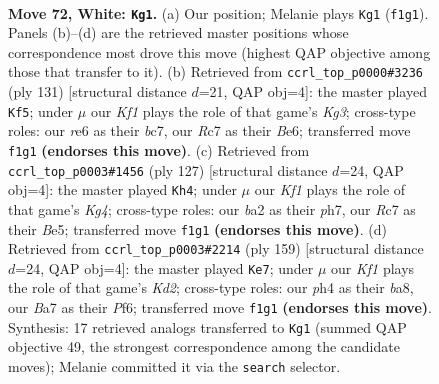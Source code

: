 \documentclass[11pt]{article}
\begin{document}
\clearpage

\begin{figure}[p]\centering
\begin{subfigure}{0.46\textwidth}\centering
\resizebox{\linewidth}{!}{%
\newchessgame
\chessboard[
  setfen={7k/B1R5/4r3/8/B3p2p/5p1P/b4P2/5K2 w - - 54 72},
  showmover=false,
  pgfstyle=straightmove, color=movearrow, markmove={f1-g1}
]}
\caption{}
\end{subfigure}\hfill
\begin{subfigure}{0.46\textwidth}\centering
\resizebox{\linewidth}{!}{%
\newchessgame
\chessboard[
  setfen={8/2B5/2p1b1k1/7p/2pP3P/6P1/3K4/8 b - - 14 66},
  showmover=false,
  pgfstyle=straightmove, color=movearrow, markmove={g6-f5}
]}
\caption{}
\end{subfigure}
\\[4pt]
\begin{subfigure}{0.46\textwidth}\centering
\resizebox{\linewidth}{!}{%
\newchessgame
\chessboard[
  setfen={8/7P/2B5/p3b1k1/P2p2p1/3P4/2P2K2/8 b - - 4 64},
  showmover=false,
  pgfstyle=straightmove, color=movearrow, markmove={g5-h4}
]}
\caption{}
\end{subfigure}\hfill
\begin{subfigure}{0.46\textwidth}\centering
\resizebox{\linewidth}{!}{%
\newchessgame
\chessboard[
  setfen={B7/3k4/3p1p1K/p4P2/4P3/1Pb5/P7/8 b - - 54 80},
  showmover=false,
  pgfstyle=straightmove, color=movearrow, markmove={d7-e7}
]}
\caption{}
\end{subfigure}
\caption{\textbf{Move 72, White: \texttt{Kg1}.} (a) Our position; Melanie plays \texttt{Kg1} (\texttt{f1g1}). Panels (b)--(d) are the retrieved master positions whose correspondence most drove this move (highest QAP objective among those that transfer to it). (b) Retrieved from \texttt{ccrl\_top\_p0000\#3236} (ply 131) [structural distance $d$=21, QAP obj=4]: the master played \texttt{Kf5}; under $\mu$ our \emph{Kf1} plays the role of that game's \emph{Kg3}; cross-type roles: our \emph{r}e6 as their \emph{b}c7, our \emph{R}c7 as their \emph{B}e6; transferred move \texttt{f1g1} \textbf{(endorses this move)}. (c) Retrieved from \texttt{ccrl\_top\_p0003\#1456} (ply 127) [structural distance $d$=24, QAP obj=4]: the master played \texttt{Kh4}; under $\mu$ our \emph{Kf1} plays the role of that game's \emph{Kg4}; cross-type roles: our \emph{b}a2 as their \emph{p}h7, our \emph{R}c7 as their \emph{B}e5; transferred move \texttt{f1g1} \textbf{(endorses this move)}. (d) Retrieved from \texttt{ccrl\_top\_p0003\#2214} (ply 159) [structural distance $d$=24, QAP obj=4]: the master played \texttt{Ke7}; under $\mu$ our \emph{Kf1} plays the role of that game's \emph{Kd2}; cross-type roles: our \emph{p}h4 as their \emph{b}a8, our \emph{B}a7 as their \emph{P}f6; transferred move \texttt{f1g1} \textbf{(endorses this move)}. Synthesis: 17 retrieved analogs transferred to \texttt{Kg1} (summed QAP objective 49, the strongest correspondence among the candidate moves); Melanie committed it via the \texttt{search} selector.}
\label{fig:thought-m142}
\end{figure}
\end{document}
